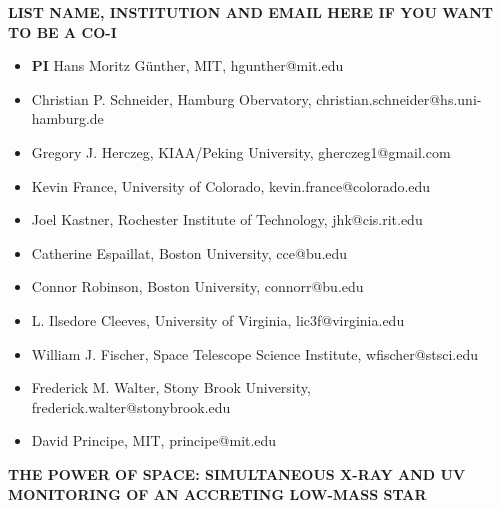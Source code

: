 \documentclass[letterpaper,11pt,twocolumn]{article}
\begin{document}
\onecolumn
\begin{center} 
\bfseries\uppercase{%
List name, institution and email here if you want to be a Co-I
}
\end{center}
\begin{itemize}
    \item \textbf{PI} Hans Moritz G\"unther, MIT, hgunther@mit.edu
    \item Christian P. Schneider, Hamburg Obervatory, christian.schneider@hs.uni-hamburg.de
\item Gregory J. Herczeg, KIAA/Peking University, gherczeg1@gmail.com
\item Kevin France, University of Colorado, kevin.france@colorado.edu
\item Joel Kastner, Rochester Institute of Technology, jhk@cis.rit.edu
\item Catherine Espaillat, Boston University, cce@bu.edu
\item Connor Robinson, Boston University, connorr@bu.edu
\item L. Ilsedore Cleeves, University of Virginia, lic3f@virginia.edu
\item William J. Fischer, Space Telescope Science Institute, wfischer@stsci.edu
\item Frederick M. Walter, Stony Brook University, frederick.walter@stonybrook.edu
\item David Principe, MIT, principe@mit.edu
\end{itemize}

\twocolumn


\pagestyle{plain}


 

\begin{center} 
\bfseries\uppercase{%
The power of space: Simultaneous X-ray and UV monitoring of an accreting
low-mass star
}
\end{center}




\end{document}
